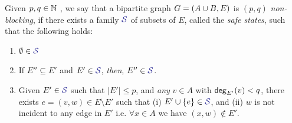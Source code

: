 \documentclass[11pt]{article}
\begin{document}
\begin{definition}
Given $p,q \in \mathbb{N}$ , we say that a bipartite graph $G = (A \cup B, E)$ is $(p, q)$ \emph{non-blocking}, if there exists a family $\Family{S}$ of subsets of $E$, called the \emph{safe states}, such that the following holds:

\begin{enumerate}
	\item $\emptyset \in \Family{S}$
	\item If $E'' \subseteq E'$ and $E' \in \Family{S}$, \emph{then}, $E'' \in \Family{S}$.
	\item Given $E' \in \Family{S}$ such that $|E'| \leq p$, and \emph{any} $v \in A$ with $\mathsf{deg}_{E'}(v) < q$, there exists $e = (v, w) \in E \setminus E'$  such that (i) $E' \cup \Set{e} \in \SafeStates $, and (ii) $w$ is not incident to any edge in $E'$ i.e. $\forall x \in A$ we have $(x,w) \notin E'$. 
\end{enumerate}

\end{definition}
\end{document}
